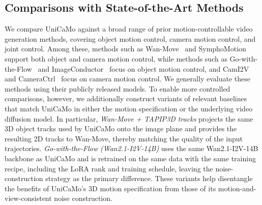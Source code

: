 \ifdefined\arxivbuild\else\documentclass{article}\fi %
\def\authornote#1#2#3{{\textcolor{#2}{\textsl{\small#1:[*#3*]}}}}
\newcommand{\son}[1]{\authornote{Son}{red}{#1}}
\begin{document}


\subsection{Comparisons with State-of-the-Art Methods}

We compare UniCaMo against a broad range of prior motion-controllable video generation methods, covering object motion control, camera motion control, and joint control. Among these, methods such as Wan-Move~\citep{chu2025wan} and SymphoMotion~\citep{zhang2026symphomotion} support both object and camera motion control, while methods such as Go-with-the-Flow~\citep{burgert2025go} and ImageConductor~\citep{wang2024imageconductor} focus on object motion control, and CamI2V~\citep{zheng2024cami2v} and CameraCtrl~\citep{he2024cameractrl} focus on camera motion control. We generally evaluate these methods using their publicly released models. To enable more controlled comparisons, however, we additionally construct variants of relevant baselines that match UniCaMo in either the motion specification or the underlying video diffusion model. In particular, \textit{Wan-Move + TAPIP3D tracks} projects the same 3D object tracks used by UniCaMo onto the image plane and provides the resulting 2D tracks to Wan-Move, thereby matching the quality of the input trajectories. \textit{Go-with-the-Flow (Wan2.1-I2V-14B)} uses the same Wan2.1-I2V-14B backbone as UniCaMo and is retrained on the same data with the same training recipe, including the LoRA rank and training schedule, leaving the noise-construction strategy as the primary difference. These variants help disentangle the benefits of UniCaMo’s 3D motion specification from those of its motion-and-view-consistent noise construction.
\end{document}
